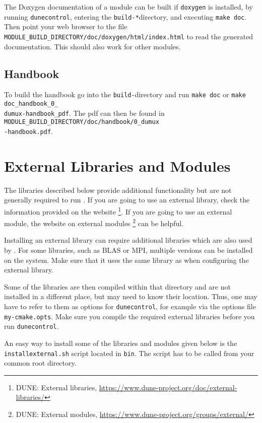 The Doxygen documentation of a module can be built if \texttt{doxygen} is installed,
by running \texttt{dunecontrol}, entering the \texttt{build-*}directory, and executing
\texttt{make doc}. Then point your web browser to the file
\texttt{MODULE\_BUILD\_DIRECTORY/doc/doxygen/html/index.html} to read the generated documentation.
This should also work for other \Dune modules.

\subsection{Handbook}
To build the \Dumux handbook go into the \texttt{build-}directory and
run \texttt{make doc} or \texttt{make doc\_handbook\_0\_\\dumux-handbook\_pdf}. The pdf can then be found
in \texttt{MODULE\_BUILD\_DIRECTORY/doc/handbook/0\_dumux\\-handbook.pdf}.

\section{External Libraries and Modules} \label{sec:external-modules-libraries}
The libraries described below provide additional functionality but are not generally required to run \Dumux.
If you are going to use an external library, check the information provided on the \Dune website%
\footnote{DUNE: External libraries, \url{https://www.dune-project.org/doc/external-libraries/}}.
If you are going to use an external \Dune module, the website on external modules%
\footnote{DUNE: External modules, \url{https://www.dune-project.org/groups/external/}}
can be helpful.

Installing an external library can require additional libraries which are also used by \Dune.
For some libraries, such as BLAS or MPI, multiple versions can be installed on the system.
Make sure that it uses the same library as \Dune when configuring the external library.

Some of the libraries are then compiled within that directory and are not installed in
a different place, but \Dune may need to know their location. Thus, one may have to refer to
them as options for \texttt{dunecontrol}, for example via the options file \texttt{my-cmake.opts}.
Make sure you compile the required external libraries before you run \texttt{dunecontrol}.

An easy way to install some of the libraries and modules given below is the
\texttt{installexternal.sh} script located in \texttt{bin}. The script
has to be called from your common root directory.


